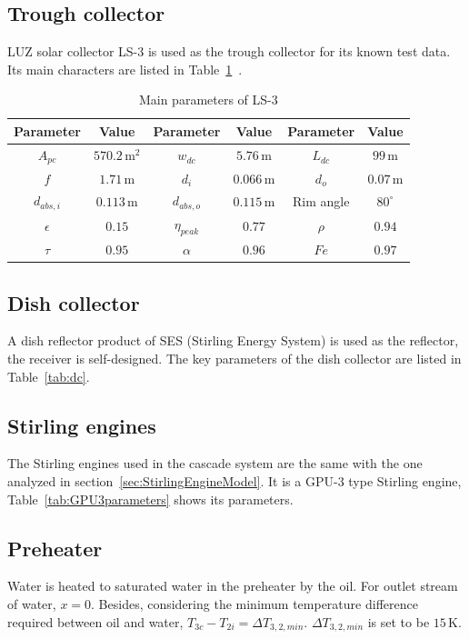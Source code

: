 \subsection{Trough collector}
LUZ solar collector LS-3 is used as the trough collector for its known test data. Its main characters are listed in Table~\ref{tab:TroughParameters}~\cite{Fernandez2010}.

\begin{table}[htbp]
	\caption{Main parameters of LS-3}
	\begin{center}
	\begin{tabular}{cccccc}
		\toprule
		Parameter		&	Value	&	Parameter		&	Value	&	Parameter		&	Value\\
		\midrule
		$A_{pc}$		&	$570.2\,\mathrm{m^2}$	&	$w_{dc}$	&	$5.76\,\mathrm{m}$	&	$L_{dc}$	&	$99\,\mathrm{m}$\\
		$f$	&	$1.71\,\mathrm{m}$	&	$d_i$		&	$0.066\,\mathrm{m}$	&	$d_o$	&	$0.07\,\mathrm{m}$\\
		$d_{abs,i}$	&	$0.113\,\mathrm{m}$	&	$d_{abs,o}$	&	$0.115\,\mathrm{m}$	&	Rim angle	&	$80^\circ$\\
		$\epsilon$		&	$0.15$	&	$\eta_{peak}$	&	$0.77$	&	$\rho$	&	$0.94$\\
		$\tau$	&	$0.95$	&	
$\alpha$	&	$0.96$	&	$Fe$	&	$0.97$\\
		\bottomrule
	\end{tabular}
	\end{center}
	\label{tab:TroughParameters}
\end{table}

\subsection{Dish collector}
A dish reflector product of SES (Stirling Energy System) is used as the reflector, the receiver is self-designed. The key parameters of the dish collector are listed in Table~\ref{tab:dc}. 

\subsection{Stirling engines}
The Stirling engines used in the cascade system are the same with the one analyzed in section~\ref{sec:StirlingEngineModel}. It is a GPU-3 type Stirling engine, Table~\ref{tab:GPU3parameters} shows its parameters.

\subsection{Preheater}
Water is heated to saturated water in the preheater by the oil. For outlet stream of water, $x = 0$.
Besides, considering the minimum temperature difference required between oil and water, $T_{3c} - T_{2i} = \Delta T_{3,2,min}$. $\Delta T_{3,2,min}$ is set to be $15\,\mathrm{K}$.

